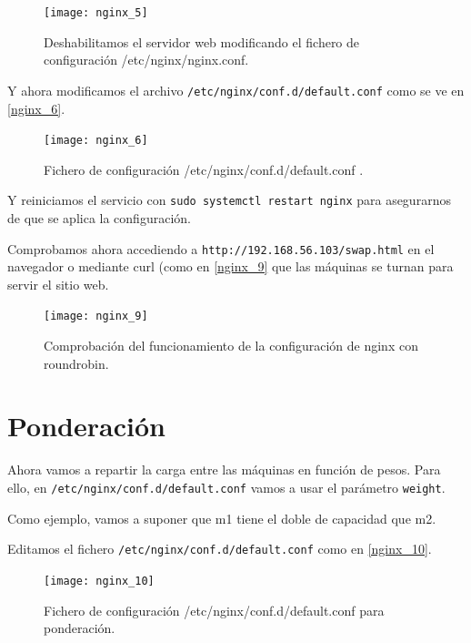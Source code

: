 \begin{figure}[h!]
\begin{center}
\caption{Deshabilitamos el servidor web modificando el fichero de configuración /etc/nginx/nginx.conf.}
\label{nginx_5}
\texttt{[image: nginx\_5]}
\end{center}
\end{figure}

Y ahora modificamos el archivo \verb|/etc/nginx/conf.d/default.conf| como se ve en \eqref{nginx_6}.

\begin{figure}[h!]
\begin{center}
\caption{Fichero de configuración /etc/nginx/conf.d/default.conf .}
\label{nginx_6}
\texttt{[image: nginx\_6]}
\end{center}
\end{figure}

Y reiniciamos el servicio con \verb|sudo systemctl restart nginx| para asegurarnos de que se aplica la configuración.

Comprobamos ahora accediendo a \verb|http://192.168.56.103/swap.html| en el navegador o mediante curl (como en \eqref{nginx_9} que las máquinas se turnan para servir el sitio web.

\begin{figure}[h!]
\begin{center}
\caption{Comprobación del funcionamiento de la configuración de nginx con roundrobin.}
\label{nginx_9}
\texttt{[image: nginx\_9]}
\end{center}
\end{figure}

\section{Ponderación}

Ahora vamos a repartir la carga entre las máquinas en función de pesos. Para ello, en \verb|/etc/nginx/conf.d/default.conf| vamos a usar el parámetro \verb|weight|.

Como ejemplo, vamos a suponer que m1 tiene el doble de capacidad que m2.

Editamos el fichero \verb|/etc/nginx/conf.d/default.conf| como en \eqref{nginx_10}.

\begin{figure}[h!]
\begin{center}
\caption{Fichero de configuración /etc/nginx/conf.d/default.conf para ponderación.}
\label{nginx_10}
\texttt{[image: nginx\_10]}
\end{center}
\end{figure}


